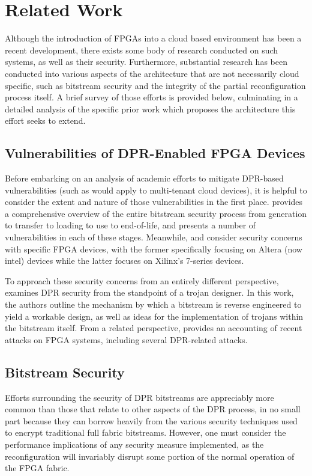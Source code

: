 
\chapter{Related Work}\label{ch:relatedWork}
Although the introduction of FPGAs into a cloud based environment has been a recent development, there exists some body of research conducted on such systems, as well as their security. Furthermore, substantial research has been conducted into various aspects of the architecture that are not necessarily cloud specific, such as bitstream security and the integrity of the partial reconfiguration process itself. A brief survey of those efforts is provided below, culminating in a detailed analysis of the specific prior work which proposes the architecture this effort seeks to extend.

\section{Vulnerabilities of DPR-Enabled FPGA Devices} \label{sec:vulnerabilities}
Before embarking on an analysis of academic efforts to mitigate DPR-based vulnerabilities (such as would apply to multi-tenant cloud devices), it is helpful to consider the extent and nature of those vulnerabilities in the first place. \cite{duncan_fpga_2019} provides a comprehensive overview of the entire bitstream security process from generation to transfer to loading to use to end-of-life, and presents a number of vulnerabilities in each of these stages. Meanwhile, \cite{swierczynski_physical_2014} and \cite{ender_unpatchable_2020} consider security concerns with specific FPGA devices, with the former specifically focusing on Altera (now intel) devices while the latter focuses on Xilinx's 7-series devices.

To approach these security concerns from an entirely different perspective, \cite{ender_insights_2019} examines DPR security from the standpoint of a trojan designer. In this work, the authors outline the mechanism by which a bitstream is reverse engineered to yield a workable design, as well as ideas for the implementation of trojans within the bitstream itself. From a related perspective, \cite{zhang_recent_2019} provides an accounting of recent attacks on FPGA systems, including several DPR-related attacks.

\section{Bitstream Security} \label{sec:bitstreamSecurity}
Efforts surrounding the security of DPR bitstreams are appreciably more common than those that relate to other aspects of the DPR process, in no small part because they can borrow heavily from the various security techniques used to encrypt traditional full fabric bitstreams. However, one must consider the performance implications of any security measure implemented, as the reconfiguration will invariably disrupt some portion of the normal operation of the FPGA fabric.

